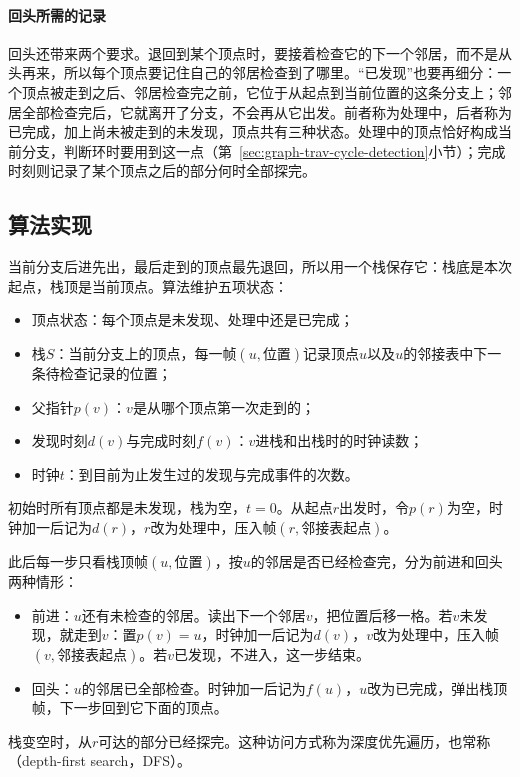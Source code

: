\paragraph{回头所需的记录}
回头还带来两个要求。退回到某个顶点时，要接着检查它的下一个邻居，而不是从头再来，所以每个顶点要记住自己的邻居检查到了哪里。“已发现”也要再细分：一个顶点被走到之后、邻居检查完之前，它位于从起点到当前位置的这条分支上；邻居全部检查完后，它就离开了分支，不会再从它出发。前者称为处理中，后者称为已完成，加上尚未被走到的未发现，顶点共有三种状态。处理中的顶点恰好构成当前分支，判断环时要用到这一点（第~\ref{sec:graph-trav-cycle-detection}小节）；完成时刻则记录了某个顶点之后的部分何时全部探完。

\subsection{算法实现}
\label{sec:graph-trav-dfs-stack}

当前分支后进先出，最后走到的顶点最先退回，所以用一个栈保存它：栈底是本次起点，栈顶是当前顶点。算法维护五项状态：
\begin{itemize}
  \item 顶点状态：每个顶点是未发现、处理中还是已完成；
  \item 栈$S$：当前分支上的顶点，每一帧$(u,\text{位置})$记录顶点$u$以及$u$的邻接表中下一条待检查记录的位置；
  \item 父指针$p(v)$：$v$是从哪个顶点第一次走到的；
  \item 发现时刻$d(v)$与完成时刻$f(v)$：$v$进栈和出栈时的时钟读数；
  \item 时钟$t$：到目前为止发生过的发现与完成事件的次数。
\end{itemize}
初始时所有顶点都是未发现，栈为空，$t=0$。从起点$r$出发时，令$p(r)$为空，时钟加一后记为$d(r)$，$r$改为处理中，压入帧$(r,\text{邻接表起点})$。

此后每一步只看栈顶帧$(u,\text{位置})$，按$u$的邻居是否已经检查完，分为前进和回头两种情形：
\begin{itemize}
  \item 前进：$u$还有未检查的邻居。读出下一个邻居$v$，把位置后移一格。若$v$未发现，就走到$v$：置$p(v)=u$，时钟加一后记为$d(v)$，$v$改为处理中，压入帧$(v,\text{邻接表起点})$。若$v$已发现，不进入，这一步结束。
  \item 回头：$u$的邻居已全部检查。时钟加一后记为$f(u)$，$u$改为已完成，弹出栈顶帧，下一步回到它下面的顶点。
\end{itemize}
栈变空时，从$r$可达的部分已经探完。这种访问方式称为深度优先遍历，也常称（depth-first search，DFS）。

